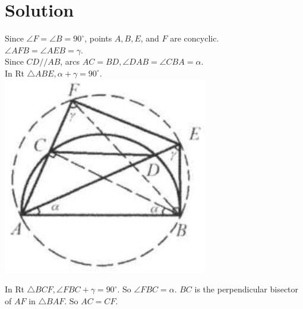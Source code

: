 \documentclass{article}
\begin{document}
\section*{Solution}
Since \(\angle F=\angle B=90^{\circ}\), points \(A, B, E\), and \(F\) are concyclic.\\
\(\angle A F B=\angle A E B=\gamma\).\\
Since \(C D / / A B\), arcs \(A C=B D, \angle D A B=\angle C B A=\alpha\).\\
In Rt \(\triangle A B E, \alpha+\gamma=90^{\circ}\).\\
\centering
\includegraphics[width=\textwidth]{images/reasoning_image_1.jpg}

In Rt \(\triangle B C F, \angle F B C+\gamma=90^{\circ}\). So \(\angle F B C=\alpha\). \(B C\) is the perpendicular bisector of \(A F\) in \(\triangle B A F\). So \(A C=C F\).
\end{document}
